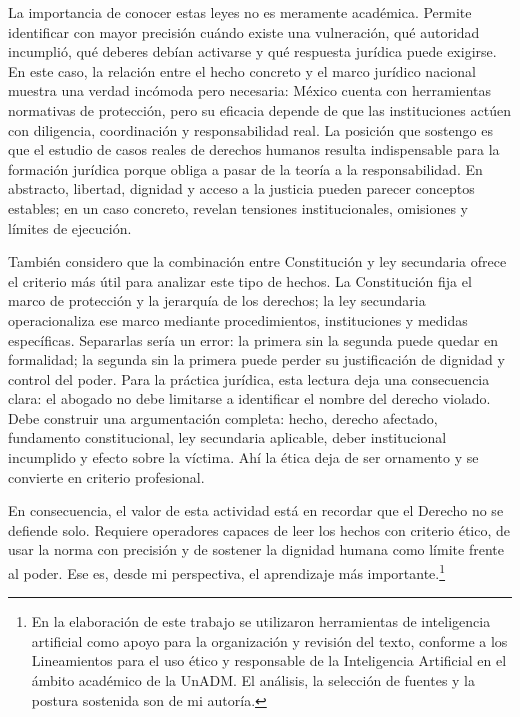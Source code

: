 \documentclass[
	spanish,
	letterpaper, oneside
]{article}
\begin{document}
La importancia de conocer estas leyes no es meramente académica. Permite identificar con mayor precisión cuándo existe una vulneración, qué autoridad incumplió, qué deberes debían activarse y qué respuesta jurídica puede exigirse. En este caso, la relación entre el hecho concreto y el marco jurídico nacional muestra una verdad incómoda pero necesaria: México cuenta con herramientas normativas de protección, pero su eficacia depende de que las instituciones actúen con diligencia, coordinación y responsabilidad real. La posición que sostengo es que el estudio de casos reales de derechos humanos resulta indispensable para la formación jurídica porque obliga a pasar de la teoría a la responsabilidad. En abstracto, libertad, dignidad y acceso a la justicia pueden parecer conceptos estables; en un caso concreto, revelan tensiones institucionales, omisiones y límites de ejecución.

También considero que la combinación entre Constitución y ley secundaria ofrece el criterio más útil para analizar este tipo de hechos. La Constitución fija el marco de protección y la jerarquía de los derechos; la ley secundaria operacionaliza ese marco mediante procedimientos, instituciones y medidas específicas. Separarlas sería un error: la primera sin la segunda puede quedar en formalidad; la segunda sin la primera puede perder su justificación de dignidad y control del poder. Para la práctica jurídica, esta lectura deja una consecuencia clara: el abogado no debe limitarse a identificar el nombre del derecho violado. Debe construir una argumentación completa: hecho, derecho afectado, fundamento constitucional, ley secundaria aplicable, deber institucional incumplido y efecto sobre la víctima. Ahí la ética deja de ser ornamento y se convierte en criterio profesional.

En consecuencia, el valor de esta actividad está en recordar que el Derecho no se defiende solo. Requiere operadores capaces de leer los hechos con criterio ético, de usar la norma con precisión y de sostener la dignidad humana como límite frente al poder. Ese es, desde mi perspectiva, el aprendizaje más importante.\footnote{En la elaboración de este trabajo se utilizaron herramientas de inteligencia artificial como apoyo para la organización y revisión del texto, conforme a los Lineamientos para el uso ético y responsable de la Inteligencia Artificial en el ámbito académico de la UnADM. El análisis, la selección de fuentes y la postura sostenida son de mi autoría.}

% 
\end{document}
